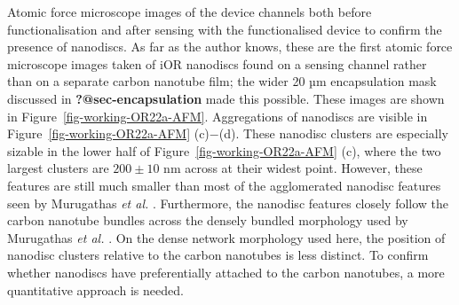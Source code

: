 \documentclass[
  a4paper,
]{scrbook}
\begin{document}
Atomic force microscope images of the device channels both before
functionalisation and after sensing with the functionalised device to
confirm the presence of nanodiscs. As far as the author knows, these are
the first atomic force microscope images taken of iOR nanodiscs found on
a sensing channel rather than on a separate carbon nanotube film; the
wider 20 µm encapsulation mask discussed in \textbf{?@sec-encapsulation}
made this possible. These images are shown in
Figure~\ref{fig-working-OR22a-AFM}. Aggregations of nanodiscs are
visible in Figure~\ref{fig-working-OR22a-AFM} (c)\(-\)(d). These
nanodisc clusters are especially sizable in the lower half of
Figure~\ref{fig-working-OR22a-AFM} (c), where the two largest clusters
are \(200\pm10\) nm across at their widest point. However, these
features are still much smaller than most of the agglomerated nanodisc
features seen by Murugathas \emph{et al.} \autocite{Murugathas2019b}.
Furthermore, the nanodisc features closely follow the carbon nanotube
bundles across the densely bundled morphology used by Murugathas
\emph{et al.} \autocite{Murugathas2019b}. On the dense network
morphology used here, the position of nanodisc clusters relative to the
carbon nanotubes is less distinct. To confirm whether nanodiscs have
preferentially attached to the carbon nanotubes, a more quantitative
approach is needed.
\end{document}
